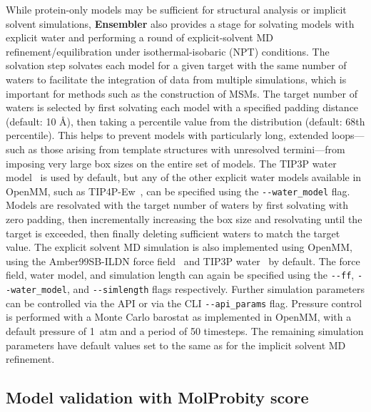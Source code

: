 \documentclass[aps,pre,twocolumn,nofootinbib,superscriptaddress,linenumbers]{revtex4-1}
\begin{document}
While protein-only models may be sufficient for structural analysis or implicit solvent simulations, {\bf Ensembler} also provides a stage for solvating models with explicit water and performing a round of explicit-solvent MD refinement/equilibration under isothermal-isobaric (NPT) conditions.
The solvation step solvates each model for a given target with the same number of waters to facilitate the integration of data from multiple simulations, which is important for methods such as the construction of MSMs.
The target number of waters is selected by first solvating each model with a specified padding distance (default: 10 \AA), then taking a percentile value from the distribution (default: 68th percentile).
This helps to prevent models with particularly long, extended loops---such as those arising from template structures with unresolved termini---from imposing very large box sizes on the entire set of models.
The TIP3P water model~\cite{tip3p} is used by default, but any of the other explicit water models available in OpenMM, such as TIP4P-Ew~\cite{tip4p-ew}, can be specified using the {\tt -{}-water\_model} flag.
Models are resolvated with the target number of waters by first solvating with zero padding, then incrementally increasing the box size and resolvating until the target is exceeded, then finally deleting sufficient waters to match the target value.
The explicit solvent MD simulation is also implemented using OpenMM, using the Amber99SB-ILDN force field~\cite{amber99sb-ildn} and TIP3P water~\cite{tip3p} by default.
The force field, water model, and simulation length can again be specified using the {\tt -{}-ff}, {\tt -{}-water\_model}, and {\tt -{}-simlength} flags respectively.
Further simulation parameters can be controlled via the API or via the CLI {\tt -{}-api\_params} flag.
Pressure control is performed with a Monte Carlo barostat as implemented in OpenMM, with a default pressure of 1~atm and a period of 50 timesteps.
The remaining simulation parameters have default values set to the same as for the implicit solvent MD refinement.

\subsection*{{\color{blue} Model validation with MolProbity score}}
\end{document}
